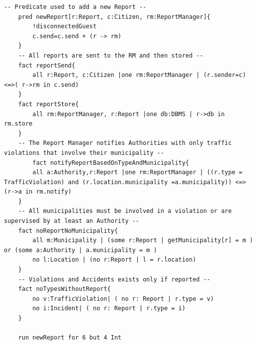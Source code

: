 \documentclass{report}
\begin{document}
\begin{lstlisting}[language=alloy]
	-- Predicate used to add a new Report --
	pred newReport[r:Report, c:Citizen, rm:ReportManager]{
		!disconnectedGuest
		c.send=c.send + (r -> rm)
	}
	-- All reports are sent to the RM and then stored --
	fact reportSend{
		all r:Report, c:Citizen |one rm:ReportManager | (r.sender=c) <=>( r->rm in c.send)
	}
	fact reportStore{
		all rm:ReportManager, r:Report |one db:DBMS | r->db in rm.store
	}
	-- The Report Manager notifies Authorities with only traffic violations that involve their municipality --
		fact notifyReportBasedOnTypeAndMunicipality{
		all a:Authority,r:Report |one rm:ReportManager | ((r.type = TrafficViolation) and (r.location.municipality =a.municipality)) <=> (r->a in rm.notify) 
	}
	-- All municipalities must be involved in a violation or are supervised by at least an Authority --
	fact noReportNoMunicipality{
		all m:Municipality | (some r:Report | getMunicipality[r] = m ) or (some a:Authority | a.municipality = m )	
		no l:Location | (no r:Report | l = r.location)
	}
	-- Violations and Accidents exists only if reported --
	fact noTypesWithoutReport{
		no v:TrafficViolation| ( no r: Report | r.type = v)
		no i:Incident| ( no r: Report | r.type = i)	
	}

	run newReport for 6 but 4 Int
\end{lstlisting}
\end{document}
